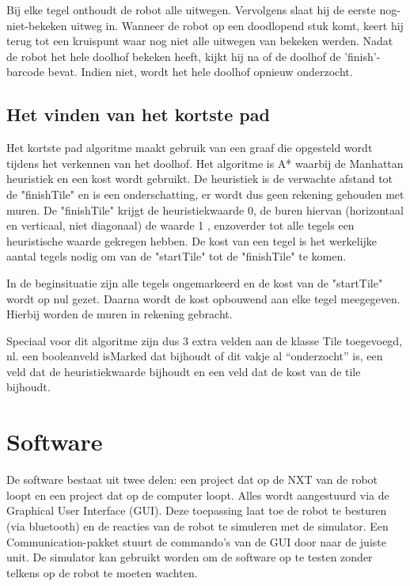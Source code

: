 \documentclass[tt3]{penoverslag}
\begin{document}
Bij elke tegel onthoudt de robot alle uitwegen. Vervolgens slaat hij de eerste nog-niet-bekeken uitweg in. Wanneer de robot op een doodlopend stuk komt, keert hij terug tot een kruispunt waar nog niet alle uitwegen van bekeken werden.
Nadat de robot het hele doolhof bekeken heeft, kijkt hij na of de doolhof de 'finish'-barcode bevat. Indien niet, wordt het hele doolhof opnieuw onderzocht.

\subsection{Het vinden van het kortste pad} %
\label{ssec:AlgoKortsteP}

Het kortste pad algoritme maakt gebruik van een graaf die opgesteld wordt tijdens het verkennen van het doolhof. Het algoritme is A* waarbij de Manhattan heuristiek en een kost wordt gebruikt.
De heuristiek is de verwachte afstand tot de "finishTile" en is een onderschatting, er wordt dus geen rekening gehouden met muren. De "finishTile" krijgt de heuristiekwaarde 0, de buren hiervan (horizontaal en verticaal, niet diagonaal) de waarde 1 , enzoverder tot alle tegels een heuristische waarde gekregen hebben.
De kost van een tegel is het werkelijke aantal tegels nodig om van de "startTile" tot de "finishTile" te komen.

In de beginsituatie zijn alle tegels ongemarkeerd en de kost van de "startTile" wordt op nul gezet. Daarna wordt de kost opbouwend aan elke tegel meegegeven. Hierbij worden de muren in rekening gebracht.

Speciaal voor dit algoritme zijn dus 3 extra velden aan de klasse Tile toegevoegd, nl. een booleanveld isMarked dat bijhoudt of dit vakje al “onderzocht” is, een veld dat de heuristiekwaarde bijhoudt en een veld dat de kost van de tile bijhoudt.


\section{Software} %
\label{sec:softw}
De software bestaat uit twee delen: een project dat op de NXT van de robot loopt en een project dat op de computer loopt. Alles wordt aangestuurd via de Graphical User Interface (GUI). Deze toepassing laat toe de robot te besturen (via bluetooth) en de reacties van de robot te simuleren met de simulator. Een Communication-pakket stuurt de commando's van de GUI door naar de juiste unit.
De simulator kan gebruikt worden om de software op te testen zonder telkens op de robot te moeten wachten.
\end{document}
